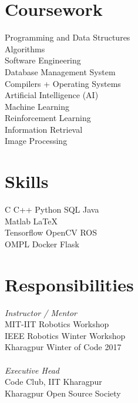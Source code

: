 \documentclass[]{deedy-resume-openfont}
\begin{document}
\begin{minipage}[t]{0.33\textwidth}
\section{Coursework}
Programming and Data Structures \\
Algorithms \\
Software Engineering \\
Database Management System \\
Compilers + Operating Systems\\
Artificial Intelligence (AI) \\
Machine Learning \\
Reinforcement Learning \\
Information Retrieval \\
Image Processing \\
\sectionsep


\section{Skills}
\textbullet{} C \textbullet{}   C++ \textbullet{} Python \textbullet{} SQL \textbullet{} Java \\
\textbullet{} Matlab \textbullet{} \LaTeX\ \\ 
\textbullet{} Tensorflow \textbullet{} OpenCV \textbullet{} ROS \\  \textbullet{} OMPL \textbullet{} Docker \textbullet{} Flask \\


\section{Responsibilities}
\textit{Instructor / Mentor} \\
\textbullet{} MIT-IIT Robotics Workshop \\
\textbullet{} IEEE Robotics Winter Workshop \\
\textbullet{} Kharagpur Winter of Code 2017 \\~\\
\textit{Executive Head} \\ 
\textbullet{} Code Club, IIT Kharagpur \\
\textbullet{} Kharagpur Open Source Society \\

%
%

\end{minipage} 
\end{document}
